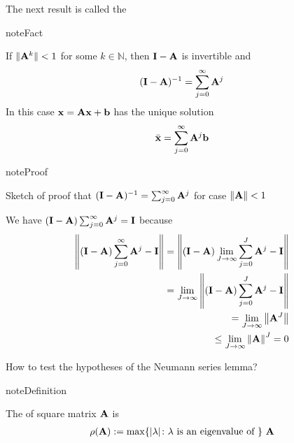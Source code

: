 \documentclass[letterpaper,10pt,english]{jupyterBook}
\begin{document}
\sphinxAtStartPar
The next result is called the 

\begin{sphinxadmonition}{note}{Fact}

\sphinxAtStartPar
If \(\| {\bf A}^k \| < 1\) for some \(k \in \mathbb{N}\), then \({\bf I} - {\bf A}\) is invertible and
\begin{equation*}
\begin{split}
%
({\bf I} - {\bf A})^{-1} = \sum_{j=0}^{\infty} {\bf A}^j
%
\end{split}
\end{equation*}
\sphinxAtStartPar
In this case \({\bf x} = {\bf A} {\bf x} + {\bf b}\) has the unique solution
\begin{equation*}
\begin{split}
%
\bar {\bf x} = \sum_{j=0}^{\infty} {\bf A}^j {\bf b} 
%
\end{split}
\end{equation*}\end{sphinxadmonition}

\begin{sphinxadmonition}{note}{Proof}

\sphinxAtStartPar
Sketch of proof that \(({\bf I} - {\bf A})^{-1} = \sum_{j=0}^{\infty} {\bf A}^j\)
for case \(\|{\bf A} \| < 1\)

\sphinxAtStartPar
We have \(({\bf I} - {\bf A}) \sum_{j=0}^{\infty} {\bf A}^j =
{\bf I} \) because
\begin{equation*}
\begin{split}
%
\left\|
({\bf I} - {\bf A}) \sum_{j=0}^{\infty} {\bf A}^j - {\bf I}
\right\|
=
\left\|
({\bf I} - {\bf A}) \lim_{J \to \infty}\sum_{j=0}^J {\bf A}^j - {\bf I}
\right\|
\\
=
\lim_{J \to \infty}
\left\|
({\bf I} - {\bf A}) \sum_{j=0}^J {\bf A}^j - {\bf I}
\right\|
\\
=
\lim_{J \to \infty}
\left\|
{\bf A}^J 
\right\|
\\
\leq
\lim_{J \to \infty}
\left\| {\bf A} \right\|^J = 0
%
\end{split}
\end{equation*}\end{sphinxadmonition}

\sphinxAtStartPar
How to test the hypotheses of the Neumann series lemma?

\begin{sphinxadmonition}{note}{Definition}

\sphinxAtStartPar
The  of square matrix \({\bf A}\) is
\begin{equation*}
\begin{split}
%
\rho({\bf A}) := \max \{ |\lambda| \colon \lambda \text{ is an eigenvalue of \} {\bf A}}
%
\end{split}
\end{equation*}\end{sphinxadmonition}
\end{document}
